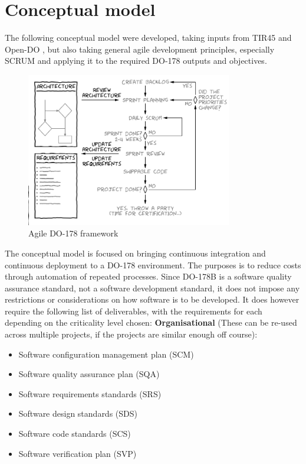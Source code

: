 \documentclass[conference]{IEEEtran}
\begin{document}
\section{Conceptual model}

The following conceptual model were developed, taking inputs from TIR45 \cite{AAMI_TIR45_2012} and Open-DO \cite{OPEN-DO_2010}, but also taking general agile development principles, especially SCRUM and applying it to the required DO-178 outputs and objectives.

\begin{figure}[t!]
\centering 
\includegraphics[width=90mm]{DO178_scrum.png}
\caption{Agile DO-178 framework}
\end{figure}

The conceptual model is focused on bringing continuous integration and continuous deployment to a DO-178 environment. The purposes is to reduce costs through automation of repeated processes. Since DO-178B is a software quality assurance standard, not a software development standard, it does not impose any restrictions or considerations on how software is to be developed. It does however require the following list of deliverables, with the requirements for each depending on the criticality level chosen:
\textbf{Organisational}
(These can be re-used across multiple projects, if the projects are similar enough off course):

\begin{itemize}
\item Software configuration management plan (SCM)
\item Software quality assurance plan (SQA)
\item Software requirements standards (SRS)
\item Software design standards (SDS)
\item Software code standards (SCS)
\item Software verification plan (SVP)
\end{itemize}
\end{document}
